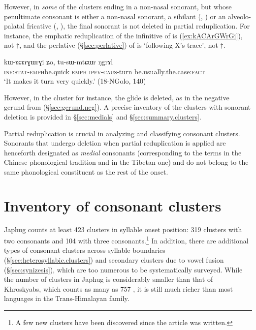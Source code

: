 However, in \textit{some} of the clusters ending in a non-nasal sonorant, but whose penultimate consonant is either a non-nasal sonorant, a sibilant (, ) or an alveolo-palatal fricative (, ), the final sonorant is not deleted in partial reduplication. For instance, the emphatic reduplication of the infinitive of  is  (\ref{ex:kACArGWrGi}), not $\dagger$, and the perlative (§\ref{sec:perlative}) of  is   `following X's trace', not $\dagger$.

\begin{exe}
	\ex \label{ex:kACArGWrGi}
	\gll kɯ-ɤɕɤrɣɯ\redp{}rɣi ʑo, tu-sɯ-mtɕɯr ŋgrɤl \\
	\textsc{inf}:\textsc{stat}-\textsc{emph}\redp{}be.quick \textsc{emph} \textsc{ipfv}-\textsc{caus}-turn be.usually.the.case:\textsc{fact} \\
	\glt `It makes it turn very quickly.' (18-NGolo, 140)
\end{exe}

However, in the cluster  for instance, the glide  is deleted, as in the negative gerund  from  (§\ref{sec:gerund.neg}). A precise inventory of the clusters with sonorant deletion is provided in  §\ref{sec:medials}  and §\ref{sec:summary.clusters}.


Partial reduplication is crucial in analyzing and classifying consonant clusters. Sonorants that undergo deletion when partial reduplication is applied are henceforth designated as \textit{medial} consonants (corresponding to the terms  in the Chinese phonological tradition and  in the Tibetan one) and do not belong to the same phonological constituent as the rest of the onset.  


\section{Inventory of consonant clusters} \label{sec:inventory.clusters}
Japhug counts at least 423 clusters in syllable onset position:  319 clusters with two consonants and 104 with three consonants.\footnote{A few new clusters have been discovered since the article \citet{jacques19ipa} was written. } In addition, there are additional types of consonant clusters across syllable boundaries (§\ref{sec:heterosyllabic.clusters}) and secondary clusters due to vowel fusion (§\ref{sec:synizesis}), which are too numerous to be systematically surveyed. While the number of clusters in Japhug is considerably smaller than that of Khroskyabs, which counts as many as 757 \citep[101]{lai17khroskyabs}, it is still much richer than most languages in the Trans-Himalayan family. 

